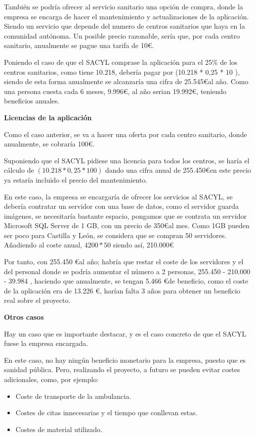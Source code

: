 También se podría ofrecer al servicio sanitario una opción de compra, donde la empresa se encarga de hacer el mantenimiento y actualizaciones de la aplicación. Siendo un servicio que depende del numero de centros sanitarios que haya en la comunidad autónoma. Un posible precio razonable, sería que, por cada centro sanitario, anualmente se pague una tarifa de 10\euro. 

Poniendo el caso de que el SACYL comprase la aplicación para el 25\% de los centros sanitarios, como tiene 10.218,
debería pagar por (10.218 * 0,25 * 10 ), siendo de esta forma anualmente se alcanzaría una cifra de 25.545\euro  al año.
Como una persona cuesta cada 6 meses, 9.996\euro, al año serian 19.992\euro, teniendo beneficios anuales.


\textbf{Licencias de la aplicación}

Como el caso anterior, se va a hacer una oferta por cada centro sanitario, donde anualmente, se cobraría 100\euro.

Suponiendo que el SACYL pidiese una licencia para todos los centros, se haría el cálculo de $(10.218 * 0,25 * 100 ) $ dando una cifra anual de 255.450\euro  en este precio ya estaría incluido el precio del mantenimiento.

En este caso, la empresa se encargaría de ofrecer los servicios al SACYL, se debería contratar un servidor con una base de datos, como el servidor guarda imágenes, se necesitaría bastante espacio, pongamos que se contrata un servidor Microsoft SQL Server de 1 GB, con un precio de 350\euro  al mes. Como 1GB pueden ser poco para Castilla y León, se considera que se compran 50 servidores. Añadiendo al coste anual, $4200 * 50 $ siendo así, 210.000\euro

Por tanto, con 255.450 \euro  al año; habría que restar el coste de los servidores y el del personal donde se podría aumentar el número a 2 personas,   255.450 - 210.000 - 39.984 , haciendo que anualmente, se tengan 5.466 \euro   de beneficio, como el coste de la aplicación era de 13.226 \euro, harían falta 3 años para obtener un beneficio real sobre el proyecto.

\textbf{Otros casos}

Hay un caso que es importante destacar, y es el caso concreto de que el SACYL fuese la empresa encargada.

En este caso, no hay ningún beneficio monetario para la empresa, puesto que es sanidad pública. Pero, realizando el proyecto, a futuro se pueden evitar costes adicionales, como, por ejemplo: 
\begin{itemize}
    \item Coste de transporte de la ambulancia.
    \item Costes de citas innecesarias y el tiempo que conllevan estas.
    \item Costes de material utilizado.
\end{itemize}

